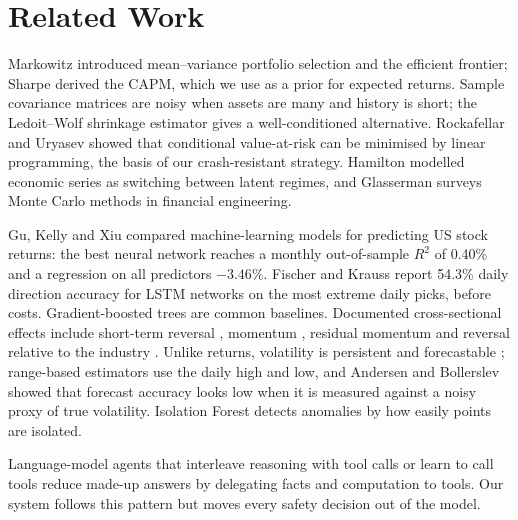 \documentclass[conference]{IEEEtran}
\begin{document}
\section{Related Work}
Markowitz \cite{markowitz1952} introduced mean--variance portfolio selection and the efficient frontier; Sharpe \cite{sharpe1964} derived the CAPM, which we use as a prior for expected returns. Sample covariance matrices are noisy when assets are many and history is short; the Ledoit--Wolf shrinkage estimator \cite{ledoit2004} gives a well-conditioned alternative. Rockafellar and Uryasev \cite{rockafellar2000} showed that conditional value-at-risk can be minimised by linear programming, the basis of our crash-resistant strategy. Hamilton \cite{hamilton1989} modelled economic series as switching between latent regimes, and Glasserman \cite{glasserman2004} surveys Monte Carlo methods in financial engineering.

Gu, Kelly and Xiu \cite{gu2020} compared machine-learning models for predicting US stock returns: the best neural network reaches a monthly out-of-sample $R^2$ of 0.40\% and a regression on all predictors $-3.46\%$. Fischer and Krauss \cite{fischer2018} report 54.3\% daily direction accuracy for LSTM networks on the most extreme daily picks, before costs. Gradient-boosted trees \cite{chen2016} are common baselines. Documented cross-sectional effects include short-term reversal \cite{jegadeesh1990}, momentum \cite{jegadeesh1993}, residual momentum \cite{blitz2011} and reversal relative to the industry \cite{da2014}. Unlike returns, volatility is persistent and forecastable \cite{corsi2009}; range-based estimators \cite{parkinson1980,garman1980,rogers1991} use the daily high and low, and Andersen and Bollerslev \cite{andersen1998} showed that forecast accuracy looks low when it is measured against a noisy proxy of true volatility. Isolation Forest \cite{liu2008} detects anomalies by how easily points are isolated.

Language-model agents that interleave reasoning with tool calls \cite{yao2023} or learn to call tools \cite{schick2023} reduce made-up answers by delegating facts and computation to tools. Our system follows this pattern but moves every safety decision out of the model.

\end{document}
